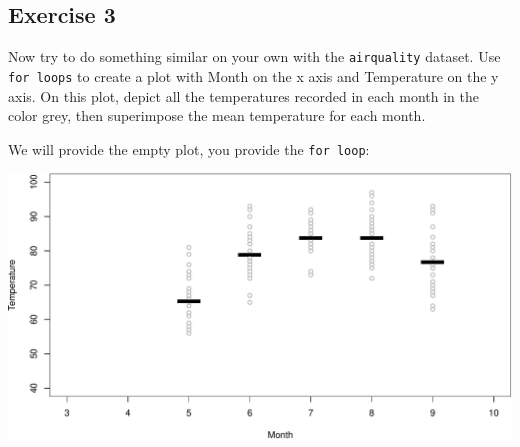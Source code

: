 \documentclass[
]{book}
\newenvironment{Shaded}{\begin{snugshade}}{\end{snugshade}}
\newcommand{\CommentTok}[1]{\textcolor[rgb]{0.56,0.35,0.01}{\textit{#1}}}
\newcommand{\ControlFlowTok}[1]{\textcolor[rgb]{0.13,0.29,0.53}{\textbf{#1}}}
\newcommand{\DataTypeTok}[1]{\textcolor[rgb]{0.13,0.29,0.53}{#1}}
\newcommand{\DecValTok}[1]{\textcolor[rgb]{0.00,0.00,0.81}{#1}}
\newcommand{\KeywordTok}[1]{\textcolor[rgb]{0.13,0.29,0.53}{\textbf{#1}}}
\newcommand{\NormalTok}[1]{#1}
\newcommand{\OperatorTok}[1]{\textcolor[rgb]{0.81,0.36,0.00}{\textbf{#1}}}
\newcommand{\StringTok}[1]{\textcolor[rgb]{0.31,0.60,0.02}{#1}}
\begin{document}
\hypertarget{exercise-3-3}{%
\subsection*{Exercise 3}\label{exercise-3-3}}

Now try to do something similar on your own with the \texttt{airquality} dataset. Use \texttt{for\ loops} to create a plot with Month on the x axis and Temperature on the y axis. On this plot, depict all the temperatures recorded in each month in the color grey, then superimpose the mean temperature for each month.

We will provide the empty plot, you provide the \texttt{for\ loop}:

\begin{Shaded}
\end{Shaded}

\includegraphics{figures/unnamed-chunk-267-1.pdf}
\end{document}

